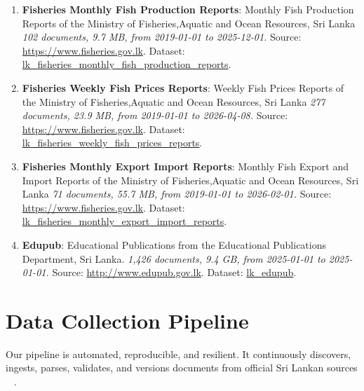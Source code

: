 \documentclass[10pt,a4paper]{article}%
\begin{document}
\begin{enumerate}
\item%
\textbf{Fisheries Monthly Fish Production Reports}: Monthly Fish Production Reports of the Ministry of Fisheries,Aquatic and Ocean Resources, Sri Lanka\textit{ 102 documents, 9.7 MB, from 2019{-}01{-}01 to 2025{-}12{-}01.} Source: \href{https://www.fisheries.gov.lk}{https://www.fisheries.gov.lk}. Dataset: \href{https://github.com/nuuuwan/lk\_fisheries/tree/data\_lk\_fisheries\_monthly\_fish\_production\_reports/data/lk\_fisheries\_monthly\_fish\_production\_reports}{lk\_fisheries\_monthly\_fish\_production\_reports}.%
\item%
\textbf{Fisheries Weekly Fish Prices Reports}: Weekly Fish Prices Reports of the Ministry of Fisheries,Aquatic and Ocean Resources, Sri Lanka\textit{ 277 documents, 23.9 MB, from 2019{-}01{-}01 to 2026{-}04{-}08.} Source: \href{https://www.fisheries.gov.lk}{https://www.fisheries.gov.lk}. Dataset: \href{https://github.com/nuuuwan/lk\_fisheries/tree/data\_lk\_fisheries\_weekly\_fish\_prices\_reports/data/lk\_fisheries\_weekly\_fish\_prices\_reports}{lk\_fisheries\_weekly\_fish\_prices\_reports}.%
\item%
\textbf{Fisheries Monthly Export Import Reports}: Monthly Fish Export and Import Reports of the Ministry of Fisheries,Aquatic and Ocean Resources, Sri Lanka\textit{ 71 documents, 55.7 MB, from 2019{-}01{-}01 to 2026{-}02{-}01.} Source: \href{https://www.fisheries.gov.lk}{https://www.fisheries.gov.lk}. Dataset: \href{https://github.com/nuuuwan/lk\_fisheries/tree/data\_lk\_fisheries\_monthly\_export\_import\_reports/data/lk\_fisheries\_monthly\_export\_import\_reports}{lk\_fisheries\_monthly\_export\_import\_reports}.%
\item%
\textbf{Edupub}: Educational Publications from the Educational Publications Department, Sri Lanka.\textit{ 1,426 documents, 9.4 GB, from 2025{-}01{-}01 to 2025{-}01{-}01.} Source: \href{http://www.edupub.gov.lk}{http://www.edupub.gov.lk}. Dataset: \href{https://github.com/nuuuwan/lk\_edupub/tree/data/data/lk\_edupub}{lk\_edupub}.%
\end{enumerate}

%
\section{Data Collection Pipeline}%
\label{sec:DataCollectionPipeline}%
Our pipeline is automated, reproducible, and
 resilient. It continuously discovers, ingests,
 parses, validates, and versions documents from
 official Sri Lankan sources%
~%
\citep{MLOpsSurvey2022}%
.%
\end{document}

